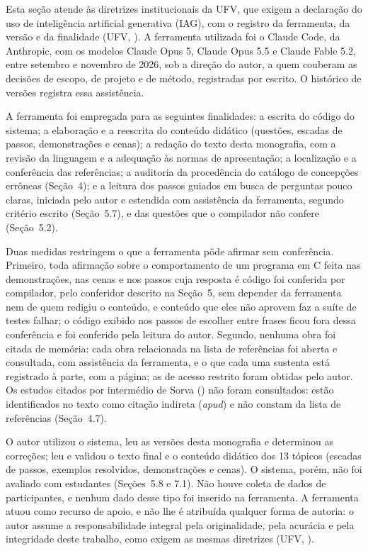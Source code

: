 
Esta seção atende às diretrizes institucionais da UFV, que exigem a declaração do uso de inteligência artificial generativa (IAG), com o registro da ferramenta, da versão e da finalidade (UFV, \citeyear{ufv2026}). A ferramenta utilizada foi o Claude Code, da Anthropic, com os modelos Claude Opus 5, Claude Opus 5.5 e Claude Fable 5.2, entre setembro e novembro de 2026, sob a direção do autor, a quem couberam as decisões de escopo, de projeto e de método, registradas por escrito. O histórico de versões registra essa assistência.

A ferramenta foi empregada para as seguintes finalidades: a escrita do código do sistema; a elaboração e a reescrita do conteúdo didático (questões, escadas de passos, demonstrações e cenas); a redação do texto desta monografia, com a revisão da linguagem e a adequação às normas de apresentação; a localização e a conferência das referências; a auditoria da procedência do catálogo de concepções errôneas (Seção~4); e a leitura dos passos guiados em busca de perguntas pouco claras, iniciada pelo autor e estendida com assistência da ferramenta, segundo critério escrito (Seção~5.7), e das questões que o compilador não confere (Seção~5.2).

Duas medidas restringem o que a ferramenta pôde afirmar sem conferência. Primeiro, toda afirmação sobre o comportamento de um programa em C feita nas demonstrações, nas cenas e nos passos cuja resposta é código foi conferida por compilador, pelo conferidor descrito na Seção~5, sem depender da ferramenta nem de quem redigiu o conteúdo, e conteúdo que eles não aprovem faz a suíte de testes falhar; o código exibido nos passos de escolher entre frases ficou fora dessa conferência e foi conferido pela leitura do autor. Segundo, nenhuma obra foi citada de memória: cada obra relacionada na lista de referências foi aberta e consultada, com assistência da ferramenta, e o que cada uma sustenta está registrado à parte, com a página; as de acesso restrito foram obtidas pelo autor. Os estudos citados por intermédio de Sorva (\citeyear{sorva2012}) não foram consultados: estão identificados no texto como citação indireta (\textit{apud}) e não constam da lista de referências (Seção~4.7).

O autor utilizou o sistema, leu as versões desta monografia e determinou as correções; leu e validou o texto final e o conteúdo didático dos 13 tópicos (escadas de passos, exemplos resolvidos, demonstrações e cenas). O sistema, porém, não foi avaliado com estudantes (Seções~5.8 e 7.1). Não houve coleta de dados de participantes, e nenhum dado desse tipo foi inserido na ferramenta. A ferramenta atuou como recurso de apoio, e não lhe é atribuída qualquer forma de autoria: o autor assume a responsabilidade integral pela originalidade, pela acurácia e pela integridade deste trabalho, como exigem as mesmas diretrizes (UFV, \citeyear{ufv2026}).
